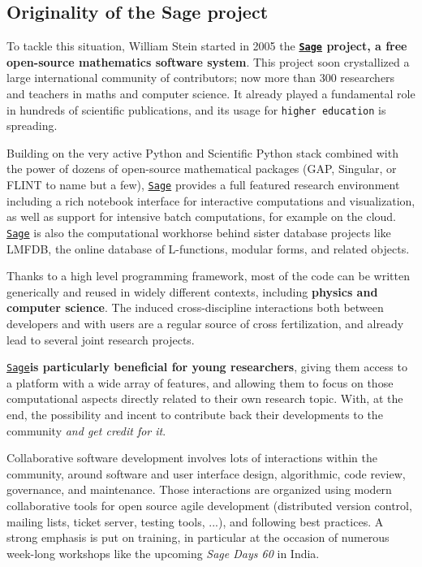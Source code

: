 \documentclass[a4,12pt]{amsart}
\newcommand{\sage}{\href{http://www.sagemath.org/}{\texttt{Sage}}\xspace}
\begin{document}
\subsection*{Originality of the Sage project}

To tackle this situation, William Stein started in 2005 the \textbf{\sage
project, a free open-source mathematics software system}. This project
soon crystallized a large international community of contributors; now
more than 300 researchers and teachers in maths and computer
science. It already played a fundamental role in hundreds of
scientific publications, and its usage for \texttt{higher education}
is spreading.

Building on the very active Python and Scientific Python stack
combined with the power of dozens of open-source mathematical packages
(GAP, Singular, or FLINT to name but a few), \sage provides a full
featured research environment including a rich notebook interface for
interactive computations and visualization, as well as support for
intensive batch computations, for example on the cloud. \sage is also
the computational workhorse behind sister database projects like
\textsc{LMFDB}, the online database of L-functions, modular forms, and
related objects.

Thanks to a high level programming framework, most of the code can be
written generically and reused in widely different contexts, including
\textbf{physics and computer science}. The induced cross-discipline
interactions both between developers and with users
are a regular source of cross fertilization, and already lead to
several joint research projects.

\sage \textbf{is particularly beneficial for young researchers},
giving them access to a platform with a wide array of features, and
allowing them to focus on those computational aspects directly related
to their own research topic. With, at the end, the possibility and
incent to contribute back their developments to the community
\emph{and get credit for it}.

Collaborative software development involves lots of interactions
within the community, around software and user interface design,
algorithmic, code review, governance, and maintenance. Those
interactions are organized using modern collaborative tools for open
source agile development (distributed version control, mailing lists,
ticket server, testing tools, ...), and following best practices. A
strong emphasis is put on training, in particular at the occasion of
numerous week-long workshops like the upcoming \emph{Sage Days 60} in
India.
\end{document}
